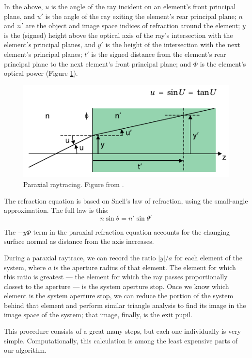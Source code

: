 \documentclass[twocolumn]{article}
\begin{document}
In the above, $u$ is the angle of the ray incident on an element's front principal
plane, and $u'$ is the angle of the ray exiting the element's rear principal plane;
$n$ and $n'$ are the object and image space indices of refraction around the element;
$y$ is the (signed) height above the optical axis of the ray's intersection with the
element's principal planes, and $y'$ is the height of the intersection with the
next element's principal planes; $t'$ is the signed distance from the element's rear
principal plane to the next element's front principal plane; and $\Phi$ is the
element's optical power (Figure \ref{fig:paraxial_raytrace}).

\begin{figure}[ht]
    \centering
    \includegraphics[width=.45\textwidth]{img/paraxial_raytrace.png}
    \caption{Paraxial raytracing. Figure from \cite{Greivenkamp2004}.}
    \label{fig:paraxial_raytrace}
\end{figure}

The refraction equation is based on Snell's law of refraction, using the small-angle
approximation. The full law is this:
\begin{equation*}
    n\sin\theta = n'\sin\theta'
\end{equation*}

The $-y\Phi$ term in the paraxial refraction equation accounts for the changing
surface normal as distance from the axis increases.

During a paraxial raytrace, we can record the ratio $|y| / a$ for each element
of the system, where $a$ is the aperture radius of that element. The element for
which this ratio is greatest --- the element for which the ray passes proportionally
closest to the aperture --- is the system aperture stop. Once we know which element
is the system aperture stop, we can reduce the portion of the system behind that
element and perform similar triangle analysis to find its image in the image space
of the system; that image, finally, is the exit pupil.

This procedure consists of a great many steps, but each one individually is very
simple. Computationally, this calculation is among the least expensive parts of
our algorithm.
\end{document}
